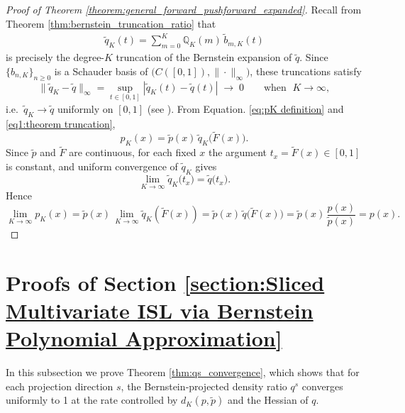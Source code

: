 \documentclass{article}
\begin{document}
\begin{proof}[Proof of Theorem \ref{theorem:general_forward_pushforward_expanded}] 
Recall from Theorem \ref{thm:bernstein_truncation_ratio} that
\begin{align}\label{eq1:theorem truncation}
\tilde q_K(t)
=\sum_{m=0}^K\mathbb Q_K(m)\,\tilde b_{m,K}(t)
\end{align}
is precisely the degree-\(K\) truncation of the Bernstein expansion of \(\tilde q\).  Since \(\{b_{n,K}\}_{n\ge0}\) is a Schauder basis of \(\bigl(C([0,1]),\|\cdot\|_\infty\bigr)\), these truncations satisfy
\[
\|\tilde q_K - \tilde q\|_\infty
=\sup_{t\in[0,1]}|\tilde q_K(t)-\tilde q(t)|
\;\longrightarrow\;0
\qquad \text{when }\;K\to\infty ,
\]
i.e.\ \(\tilde q_K\to\tilde q\) uniformly on \([0,1]\) (see \cite[Section 1.1]{lorentz2012bernstein}). From Equation. \eqref{eq:pK definition} and \ref{eq1:theorem truncation},
\[
p_K(x)
=\tilde p(x)\,\tilde q_K\bigl(\tilde F(x)\bigr).
\]
Since \(\tilde p\) and \(\tilde F\) are continuous, for each fixed \(x\) the argument 
\(t_x=\tilde F(x)\in[0,1]\) is constant, and uniform convergence of \(\tilde q_K\) gives
\[
\lim_{K\to\infty}\tilde q_K\bigl(t_x\bigr)
=\tilde q\bigl(t_x\bigr).
\]
Hence
\[
\lim_{K\to\infty}p_K(x)
=\tilde p(x)\,\lim_{K\to\infty}\tilde q_K(\tilde F(x))
=\tilde p(x)\,\tilde q\bigl(\tilde F(x)\bigr)
=\tilde p(x)\,\frac{p(x)}{\tilde p(x)}
= p(x).
\]
\end{proof}

\section{Proofs of Section \ref{section:Sliced Multivariate ISL via Bernstein Polynomial Approximation}} \label{section: Multidimensional Extension of the Projection Schema}


In this subsection we prove Theorem \ref{thm:qs_convergence}, which shows that for each projection direction \(s\), the Bernstein‐projected density ratio \(q^s\) converges uniformly to 1 at the rate controlled by \(d_K(p,\tilde p)\) and the Hessian of \(q\).    
\end{document}
